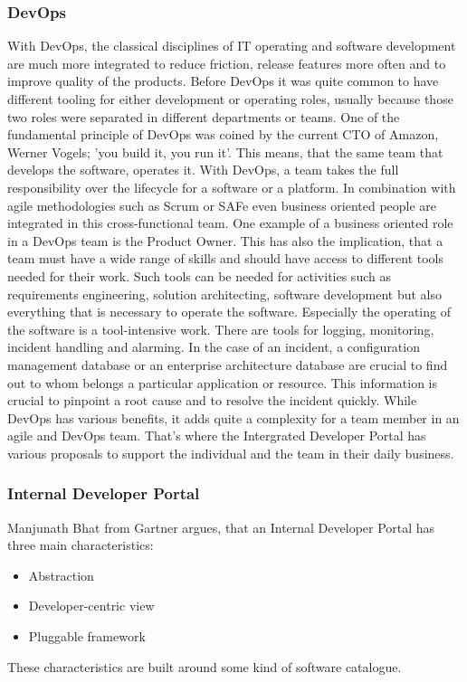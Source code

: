 \documentclass[a4paper,12pt]{article}
\begin{document}
    \subsubsection{DevOps}
    With DevOps, the classical disciplines of IT operating and software development are much more integrated to reduce
    friction, release features more often and to improve quality of the products\cite{safedevops}.
    Before DevOps it was quite common to have different tooling for either development or operating roles, usually
    because those two roles were separated in different departments or teams.
    One of the fundamental principle of DevOps was coined by the current CTO of Amazon, Werner Vogels;
    'you build it, you run it'\cite{vogels}.
    This means, that the same team that develops the software, operates it.
    With DevOps, a team takes the full responsibility over the lifecycle for a software or a platform.
    In combination with agile methodologies such as Scrum or SAFe even business oriented people are integrated in this
    cross-functional team.
    One example of a business oriented role in a DevOps team is the Product Owner\cite{safepo}.
    This has also the implication, that a team must have a wide range of skills and should have access to different
    tools needed for their work.
    Such tools can be needed for activities such as requirements engineering, solution architecting, software development
    but also everything that is necessary to operate the software.
    Especially the operating of the software is a tool-intensive work.
    There are tools for logging, monitoring, incident handling and alarming.
    In the case of an incident, a configuration management database or an enterprise architecture database are crucial
    to find out to whom belongs a particular application or resource.
    This information is crucial to pinpoint a root cause and to resolve the incident quickly.
    While DevOps has various benefits, it adds quite a complexity for a team member in an agile and DevOps team.
    That's where the Intergrated Developer Portal has various proposals to support the individual and the team in their
    daily business.

    \subsubsection{Internal Developer Portal}
    Manjunath Bhat from Gartner argues, that an Internal Developer Portal has three main characteristics\cite{gartner}:
    \begin{itemize}
        \item Abstraction
        \item Developer-centric view
        \item Pluggable framework
    \end{itemize}
    These characteristics are built around some kind of software catalogue.
\end{document}
